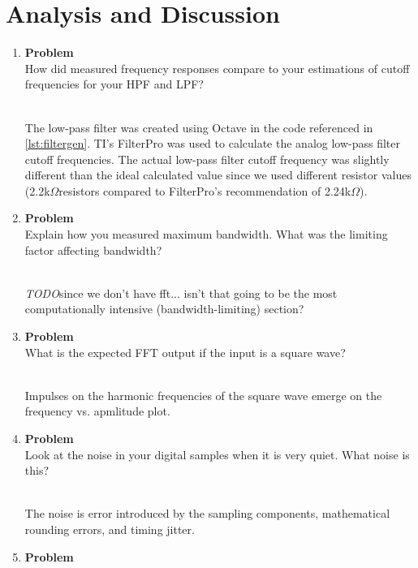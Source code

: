 \documentclass[12pt]{article}
\newenvironment{Ex}{\textbf{Problem}\vspace{.25em}\\}{}
\newcommand{\todo}{{\LARGE \emph{\color{red}TODO}}}
\newcommand{\ohm}{$\Omega$}
\newcommand{\hbr}{\hfill\vspace{.25em}\\}
\begin{document}
\section{Analysis and Discussion}
\begin{enumerate}[1)]
\item
  \begin{Ex}
    How did measured frequency responses compare to your estimations
    of cutoff frequencies for your HPF and LPF?
    \begin{solution} \hbr
      The low-pass filter was created using Octave in the code
      referenced in \cref{lst:filtergen}. TI's FilterPro was used to
      calculate the analog low-pass filter cutoff frequencies. The
      actual low-pass filter cutoff frequency was slightly different
      than the ideal calculated value since we used different resistor
      values (2.2k\ohm resistors compared to FilterPro's recommendation
      of 2.24k\ohm).
    \end{solution}
  \end{Ex}
\item
  \begin{Ex}
    Explain how you measured maximum bandwidth. What was the
    limiting factor affecting bandwidth?
    \begin{solution} \hbr
      \todo since we don't have fft... isn't that going to be the most
      computationally intensive (bandwidth-limiting) section?
    \end{solution}
  \end{Ex}
\item
  \begin{Ex}
    What is the expected FFT output if the input is a square wave?
    \begin{solution} \hbr
      Impulses on the harmonic frequencies of the square wave emerge on
      the frequency vs. apmlitude plot.
    \end{solution}
  \end{Ex}
\item
  \begin{Ex}
    Look at the noise in your digital samples when it is very
    quiet. What noise is this?
    \begin{solution} \hbr
      The noise is error introduced by the sampling components,
      mathematical rounding errors, and timing jitter.
    \end{solution}
  \end{Ex}
\item
  \begin{Ex}

\end{Ex}
\end{enumerate}
\end{document}
